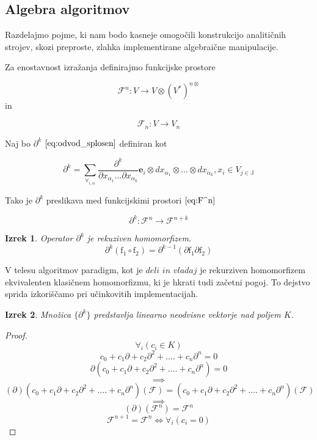 \documentclass{article}
\newcommand{\JJ}{\mathbb{J}}
\newcommand{\e}{\mathbf{e}}
\newcommand{\F}{\mathcal{F}}
\newcommand{\D}{\partial}
\newtheorem{izrek}{Izrek}[section]
\begin{document}
\subsection{Algebra algoritmov}

Razdelajmo pojme, ki nam bodo kasneje omogočili konstrukcijo analitičnih strojev, skozi preproste, zlahka implementirane algebraične manipulacije.

Za enostavnost izražanja definirajmo funkcijske prostore

 \begin{equation}\label{eq:F^n}
 	\F^n:V\to V\otimes(V^*)^{n\otimes}
 \end{equation}
 in
 
 \begin{equation}\label{eq:F_n}
 	\F_n:V\to V_n
 \end{equation}
 
Naj bo $\D^k$ $\eqref{eq:odvod_splosen}$ definiran kot

\begin{equation}\label{eq:dd}
	\partial^k=\sum_{\forall_{i,\alpha}}\frac{\partial^k}{\partial
	    x_{\alpha_1}\ldots \partial x_{\alpha_k}}\e_i\otimes
	  dx_{\alpha_1}\otimes\ldots \otimes dx_{\alpha_k} , x_i\in V_{j\in\JJ}
\end{equation}

Tako je $\D^k$ preslikava med funkcijskimi prostori $\eqref{eq:F^n}$
 
 \begin{equation}\label{eq:toFn+k}
 \D^k:\F^n\to\F^{n+k}
 \end{equation}
 
 \begin{izrek}\label{izr:D^nRek}
 	Operator $\D^k$ je rekuziven homomorfizem.
 	$$\D^k(\mathrm{f_1}\circ \mathrm{f_2})=\D^{k-1}(\D \mathrm{f_1}\D \mathrm{f_2})$$
 \end{izrek}
 
 V telesu algoritmov paradigm, kot je $\textit{deli in vladaj}$ je rekurziven homomorfizem ekvivalenten klasičnem homomorfizmu, ki je hkrati tudi začetni pogoj. To dejstvo sprida izkoriščamo pri učinkovitih implementacijah.
 
 \begin{izrek}\label{izr:linearnaNeodvisnost}
  Množica $\{\partial^k\}$ predstavlja linearno neodvisne vektorje nad poljem $K$.
 \end{izrek}
 
 \begin{proof} 
 $$\forall_i(c_i\in K)$$
	  $$c_0+c_1\D+c_2\D^2+....+c_n\D^n=0$$
	$$\D(c_0+c_1\D+c_2\D^2+....+c_n\D^n)=0$$
	$$\implies$$
	$$(\D)(c_0+c_1\D+c_2\D^2+....+c_n\D^n)(\F)=(c_0+c_1\D+c_2\D^2+....+c_n\D^n)(\F)$$
	$$\implies$$
	$$(\D)(\F^n)=\F^n$$
	$$\F^{n+1}=\F^n\iff\forall_i(c_i=0)$$
	
 \end{proof}
 
\end{document}
